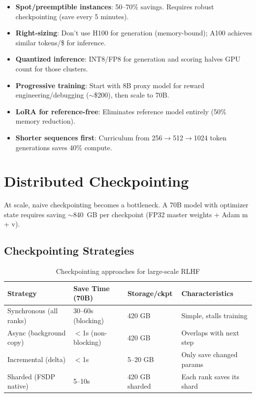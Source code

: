 \begin{itemize}
  \item \textbf{Spot/preemptible instances}: 50--70\% savings. Requires robust checkpointing (save every 5 minutes).
  \item \textbf{Right-sizing}: Don’t use H100 for generation (memory-bound); A100 achieves similar tokens/\$ for inference.
  \item \textbf{Quantized inference}: INT8/FP8 for generation and scoring halves GPU count for those clusters.
  \item \textbf{Progressive training}: Start with 8B proxy model for reward engineering/debugging ($\sim$\$200), then scale to 70B.
  \item \textbf{LoRA for reference-free}: Eliminates reference model entirely (50\% memory reduction).
  \item \textbf{Shorter sequences first}: Curriculum from 256$\rightarrow$512$\rightarrow$1024 token generations saves 40\% compute.
\end{itemize}

\section{Distributed Checkpointing}
\label{sec:checkpointing}

At scale, naive checkpointing becomes a bottleneck. A 70B model with optimizer state requires saving $\sim$840~GB per checkpoint (FP32 master weights + Adam m + v).

\subsection{Checkpointing Strategies}
\label{checkpointing-strategies}

\begin{table}[ht!]
\centering
\caption{Checkpointing approaches for large-scale RLHF}
\begin{tabular}{@{}lp{3.5cm}p{3.5cm}p{6cm}@{}}
\toprule
\textbf{Strategy} & \textbf{Save Time (70B)} & \textbf{Storage/ckpt} & \textbf{Characteristics} \\
\midrule
Synchronous (all ranks) & 30--60s (blocking) & 420 GB & Simple, stalls training \\
Async (background copy) & $<$1s (non-blocking) & 420 GB & Overlaps with next step \\
Incremental (delta) & $<$1s & 5--20 GB & Only save changed params \\
Sharded (FSDP native) & 5--10s & 420 GB sharded & Each rank saves its shard \\
\bottomrule
\end{tabular}
\end{table}

